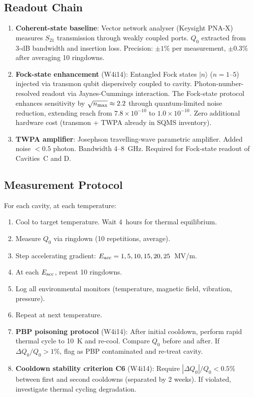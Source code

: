 \documentclass[11pt]{article}
\newcommand{\ee}[1]{\times 10^{#1}}
\begin{document}
\subsection{Readout Chain}

\begin{enumerate}[nosep]
\item \textbf{Coherent-state baseline}: Vector network analyser
  (Keysight PNA-X) measures $S_{21}$ transmission through weakly
  coupled ports. $Q_0$ extracted from 3-dB bandwidth and insertion
  loss. Precision: $\pm 1\%$ per measurement, $\pm 0.3\%$ after
  averaging 10 ringdowns.

\item \textbf{Fock-state enhancement} (W4i14): Entangled Fock states
  $|n\rangle$ ($n = 1$--$5$) injected via transmon qubit dispersively
  coupled to cavity. Photon-number-resolved readout via Jaynes-Cummings
  interaction. The Fock-state protocol enhances sensitivity by
  $\sqrt{n_{\rm max}} \approx 2.2$ through quantum-limited noise
  reduction, extending reach from $7.8\ee{-10}$ to $1.0\ee{-10}$.
  Zero additional hardware cost (transmon + TWPA already in SQMS
  inventory).

\item \textbf{TWPA amplifier}: Josephson travelling-wave parametric
  amplifier. Added noise $< 0.5$ photon. Bandwidth 4--8~GHz. Required
  for Fock-state readout of Cavities~C and D.
\end{enumerate}

\subsection{Measurement Protocol}

For each cavity, at each temperature:
\begin{enumerate}[nosep]
\item Cool to target temperature. Wait 4~hours for thermal equilibrium.
\item Measure $Q_0$ via ringdown (10 repetitions, average).
\item Step accelerating gradient: $E_{\rm acc} = 1, 5, 10, 15, 20, 25$~MV/m.
\item At each $E_{\rm acc}$, repeat 10 ringdowns.
\item Log all environmental monitors (temperature, magnetic field,
  vibration, pressure).
\item Repeat at next temperature.
\item \textbf{PBP poisoning protocol} (W4i14): After initial cooldown,
  perform rapid thermal cycle to 10~K and re-cool. Compare $Q_0$
  before and after. If $\Delta Q_0 / Q_0 > 1\%$, flag as PBP
  contaminated and re-treat cavity.
\item \textbf{Cooldown stability criterion C6} (W4i14): Require
  $|\Delta Q_0|/Q_0 < 0.5\%$ between first and second cooldowns
  (separated by 2 weeks). If violated, investigate thermal cycling
  degradation.
\end{enumerate}
\end{document}
